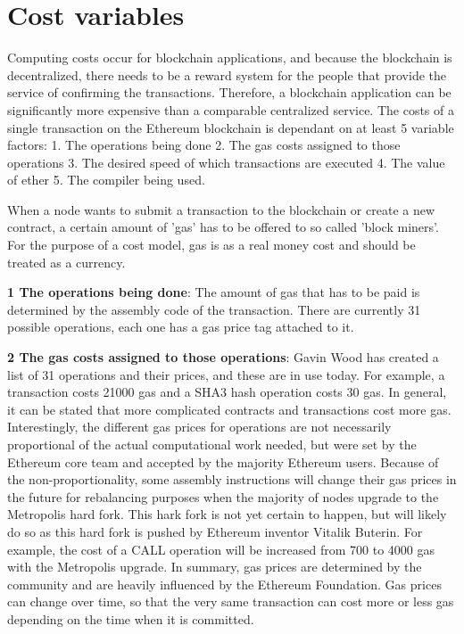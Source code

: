 \section{Cost variables}
Computing costs occur for blockchain applications, and because the blockchain is decentralized, there needs to be a reward system for the people that provide the service of confirming the transactions.
Therefore, a blockchain application can be significantly more expensive than a comparable centralized service. The costs of a single transaction on the Ethereum blockchain is dependant on at least 5 variable factors: 1. The operations being done 2. The gas costs assigned to those operations 3. The desired speed of which transactions are executed 4. The value of ether 5. The compiler being used.

When a node wants to submit a transaction to the blockchain or create a new contract, a certain amount of {'}gas{'} has to be offered to so called {'}block miners{'}. For the purpose of a cost model, gas is as a real money cost and should be treated as a currency.

\textbf{1 The operations being done}: The amount of gas that has to be paid is determined by the assembly code of the transaction. There are currently 31 possible operations, each one has a gas price tag attached to it.

\par
\textbf{2 The gas costs assigned to those operations}: Gavin Wood has created a list of 31 operations and their prices, and these are in use today. For example, a transaction costs 21000 gas and a SHA3 hash operation costs 30 gas. In general, it can be stated that more complicated contracts and transactions cost more gas. Interestingly, the different gas prices for operations are not necessarily proportional of the actual computational work needed, but were set by the Ethereum core team and accepted by the majority Ethereum users. Because of the non-proportionality, some assembly instructions will change their gas prices in the future for rebalancing purposes when the majority of nodes upgrade to the Metropolis hard fork. This hark fork is not yet certain to happen, but will likely do so as this hard fork is pushed by Ethereum inventor Vitalik Buterin. For example, the cost of a CALL operation will be increased from 700 to 4000 gas with the Metropolis upgrade.
In summary, gas prices are determined by the community and are heavily influenced by the Ethereum Foundation. Gas prices can change over time, so that the very same transaction can cost more or less gas depending on the time when it is committed.

